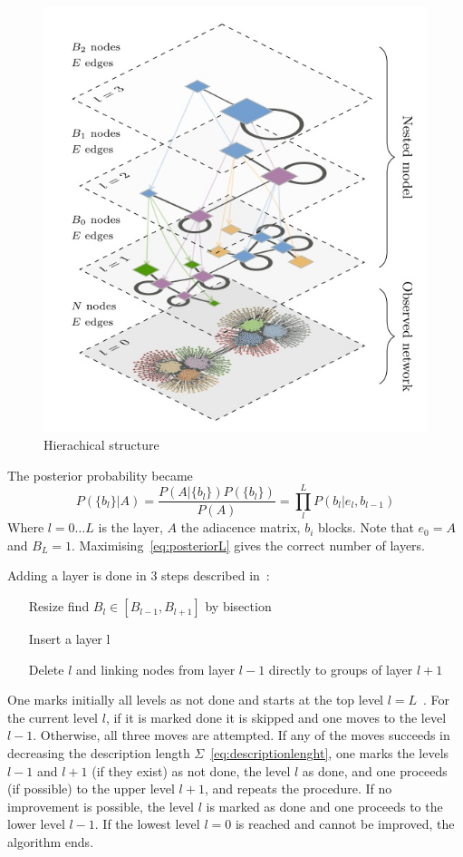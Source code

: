 \begin{figure}
  \centering
  \includegraphics[width=0.6\linewidth]{pictures/topic/topic_peixioto_hierarchic.jpg}
  \caption{Hierachical structure}
  \label{fig:topic_peixioto_hierarchic}
\end{figure}

The posterior probability became
\begin{equation}\label{eq:posteriorL}
  P(\{b_l\}|A)=\frac{P(A|\{b_l\})P(\{b_l\})}{P(A)}=\prod_l^L P(b_l|e_l,b_{l-1})
\end{equation}
Where $l=0\dots L$ is the layer, $A$ the adiacence matrix, $b_i$ blocks. Note that $e_0=A$ and $B_L=1$.
Maximising~\ref{eq:posteriorL} gives the correct number of layers.

Adding a layer is done in 3 steps described in~\cite{peixoto2014hierarchic}:
\begin{itemize}
  \item[Resize] find $B_l\in[B_{l-1},B_{l+1}]$ by bisection
  \item[Insert] a layer l
  \item[Delete] $l$ and linking nodes from layer $l-1$ directly to groups of layer
  $l+1$
\end{itemize}
One marks initially all levels as not done and starts at the top level $l = L$~\cite{peixoto2014hierarchic}.
For the current level $l$, if it is marked done it is skipped and one moves to the level $l-1$.
Otherwise, all three moves are attempted. If any of the moves succeeds in decreasing the description length $\Sigma$~\ref{eq:descriptionlenght},
one marks the levels $l-1$ and $l+1$ (if they exist) as not done, the level $l$ as done, and one proceeds (if possible)
to the upper level $l+1$, and repeats the procedure.
If no improvement is possible, the level $l$ is marked as done and one proceeds to the lower level $l-1$.
If the lowest level $l=0$ is reached and cannot be improved, the algorithm ends.


